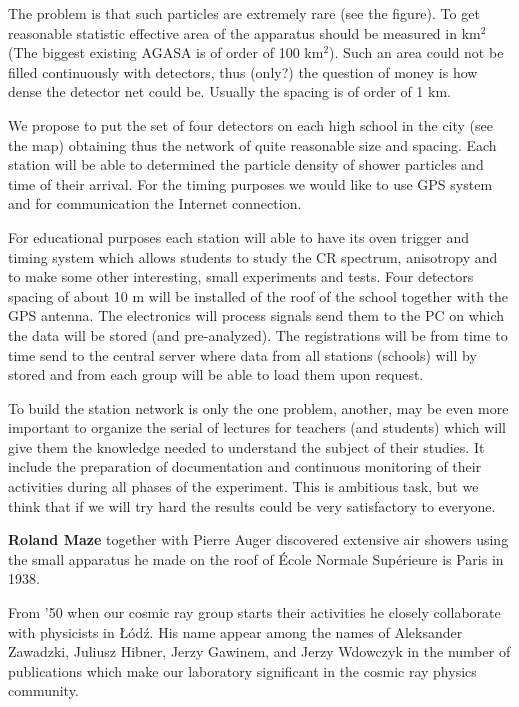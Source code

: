 The problem is that such particles are extremely rare (see the figure). To
get reasonable statistic effective area of the apparatus should be measured
in km$^2$ (The biggest existing AGASA is of order of 100 km$^2$). Such an area
could not be filled continuously with detectors, thus (only?) the question of
money is how dense the detector net could be. Usually the spacing is of order
of 1 km.

\newpage
We propose to put the set of four detectors on each high school in the city 
(see the map) obtaining thus the network of quite reasonable size and
spacing. Each station will be able to determined the particle density of
shower particles and time of their arrival. For the timing purposes we would
like to use GPS system and for communication the Internet connection.

\newpage
For educational purposes each station will able to have its oven trigger and
timing system which allows students to study the CR spectrum, anisotropy and to
make some other interesting, small experiments and tests. 
Four detectors spacing of about 10 m will be installed of the roof of the
school together with the GPS antenna. The electronics will process
signals send them to the PC on which the data will be stored (and
pre-analyzed). The registrations will be from time to time send to the central
server where data from all stations (schools) will by stored and from each 
group will be able to load them upon request.

\newpage
To build the station network is only the one problem, another, may be even more
important to organize the serial of lectures for teachers (and students) which
will give them the knowledge needed to understand the
subject of their studies. It include the preparation of documentation and 
continuous monitoring of their activities during all phases of the experiment.
This is ambitious task, but we think that if we will try hard the results
could be very satisfactory to everyone.

\newpage
{\bf Roland Maze} 
together with Pierre Auger discovered extensive air showers using the small
apparatus he made on the roof of 
\'{E}cole Normale Sup\'{e}rieure is Paris in 1938. 

From '50 when our cosmic ray group starts their activities he
closely collaborate with physicists in {\L }\'{o}d\'{z}. His name
appear among the names of Aleksander Zawadzki,
 Juliusz
Hibner, Jerzy
 Gawinem, and Jerzy Wdowczyk in the number of
publications which make our laboratory significant in the
cosmic ray physics community.

